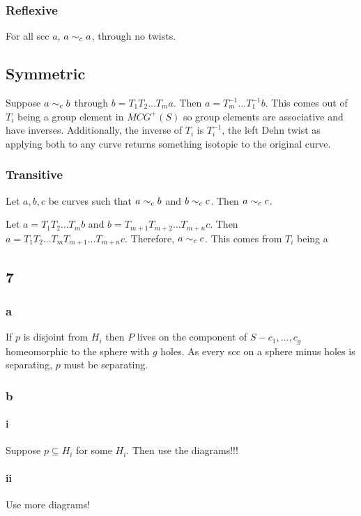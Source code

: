 \documentclass{article}
\theoremstyle{definition}
\numberwithin{theorem}{section}
\numberwithin{equation}{section}
\begin{document}
\subsubsection{Reflexive}
For all scc $a$, $a \sim_c a$, through no twists.

\subsection{Symmetric}
Suppose $a \sim_c b$ through $b = T_1 T_2 ... T_m a$. Then $a = T_m^{-1} ... T_1^{-1}b$. This comes out of $T_i$ being a group element in $MCG^+(S)$ so group elements are associative and have inverses. Additionally, the inverse of $T_i$ is $T_i^{-1}$, the left Dehn twist as applying both to any curve returns something isotopic to the original curve. 

\subsubsection{Transitive}
Let $a, b, c$ be curves such that $a \sim_c b$ and $b \sim_c c$. Then $a \sim_c c$. 

Let $a = T_1 T_2 ... T_m b$ and $b = T_{m + 1} T_{m + 2}... T_{m + n} c$. Then $a = T_1 T_2 ... T_m T_{m + 1} ... T_{m + n} c$. Therefore, $a \sim_c c$. This comes from $T_i$ being a 

\subsection{7}

\subsubsection{a}
If $p$ is disjoint from $H_i$ then $P$ lives on the component of $S - c_1, ..., c_g$ homeomorphic to the sphere with $g$ holes. As every scc on a sphere minus holes is separating, $p$ must be separating. 

\subsubsection{b}
\paragraph*{i}
Suppose $p \subseteq H_i$ for some $H_i$. Then use the diagrams!!!


\paragraph*{ii}

Use more diagrams!
\end{document}
